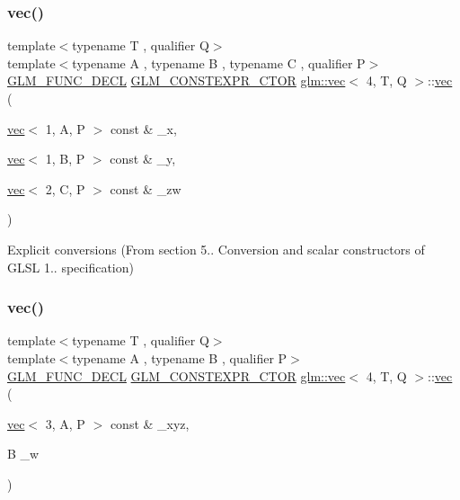 \subsubsection{\texorpdfstring{vec()}{vec()}\hspace{0.1cm}{\footnotesize\ttfamily [13/34]}}
{\footnotesize\ttfamily template$<$typename T , qualifier Q$>$ \\
template$<$typename A , typename B , typename C , qualifier P$>$ \\
\hyperlink{setup_8hpp_ab2d052de21a70539923e9bcbf6e83a51}{G\+L\+M\+\_\+\+F\+U\+N\+C\+\_\+\+D\+E\+CL} \hyperlink{setup_8hpp_ad34178a09666081abdb573c14d1f4a5a}{G\+L\+M\+\_\+\+C\+O\+N\+S\+T\+E\+X\+P\+R\+\_\+\+C\+T\+OR} \hyperlink{structglm_1_1vec}{glm\+::vec}$<$ 4, T, Q $>$\+::\hyperlink{structglm_1_1vec}{vec} (\begin{DoxyParamCaption}\item[{\hyperlink{structglm_1_1vec}{vec}$<$ 1, A, P $>$ const \&}]{\+\_\+x,  }\item[{\hyperlink{structglm_1_1vec}{vec}$<$ 1, B, P $>$ const \&}]{\+\_\+y,  }\item[{\hyperlink{structglm_1_1vec}{vec}$<$ 2, C, P $>$ const \&}]{\+\_\+zw }\end{DoxyParamCaption})}



Explicit conversions (From section 5.. Conversion and scalar constructors of G\+L\+SL 1.. specification) 

\mbox{\label{structglm_1_1vec_3_014_00_01_t_00_01_q_01_4_af4d56895a23186981b30f2ef72a780c9}} 
\subsubsection{\texorpdfstring{vec()}{vec()}\hspace{0.1cm}{\footnotesize\ttfamily [14/34]}}
{\footnotesize\ttfamily template$<$typename T , qualifier Q$>$ \\
template$<$typename A , typename B , qualifier P$>$ \\
\hyperlink{setup_8hpp_ab2d052de21a70539923e9bcbf6e83a51}{G\+L\+M\+\_\+\+F\+U\+N\+C\+\_\+\+D\+E\+CL} \hyperlink{setup_8hpp_ad34178a09666081abdb573c14d1f4a5a}{G\+L\+M\+\_\+\+C\+O\+N\+S\+T\+E\+X\+P\+R\+\_\+\+C\+T\+OR} \hyperlink{structglm_1_1vec}{glm\+::vec}$<$ 4, T, Q $>$\+::\hyperlink{structglm_1_1vec}{vec} (\begin{DoxyParamCaption}\item[{\hyperlink{structglm_1_1vec}{vec}$<$ 3, A, P $>$ const \&}]{\+\_\+xyz,  }\item[{B}]{\+\_\+w }\end{DoxyParamCaption})}



